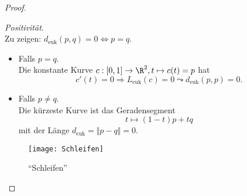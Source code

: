 \begin{theorem}
\begin{proof}
\begin{itemize}
      \begin{minipage}{.45\textwidth}
        \item \emph{Positivität}. \\
          Zu zeigen: \( d_\text{euk}(p,q) = 0 \Leftrightarrow p = q \).
          \begin{itemize}
            \item Falls \( p = q \). \\
              Die konstante Kurve \( c: [0,1] \to \R^2, t \mapsto c(t) = p \) hat 
              \begin{equation*}
                c'(t) = 0 \Rightarrow L_\text{euk}(c) = 0 \leadsto d_\text{euk}(p,p) = 0 \text{.}
              \end{equation*}
            \item Falls \( p \neq q \). \\
              Die kürzeste Kurve ist das Geradensegment\footnotemark{}
              \begin{equation*}
                t \mapsto (1-t)p + tq
              \end{equation*}
              mit der Länge \( d_\text{euk} = \Vert p - q \Vert = 0 \).
          \end{itemize}
      \end{minipage}
      \hfill
      \begin{minipage}{.45\textwidth}
        \begin{figure}[H]
          \texttt{[image: Schleifen]}
          \caption{``Schleifen''}
        \end{figure}
      \end{minipage}
    \end{itemize}
  \end{proof}
\end{theorem}

